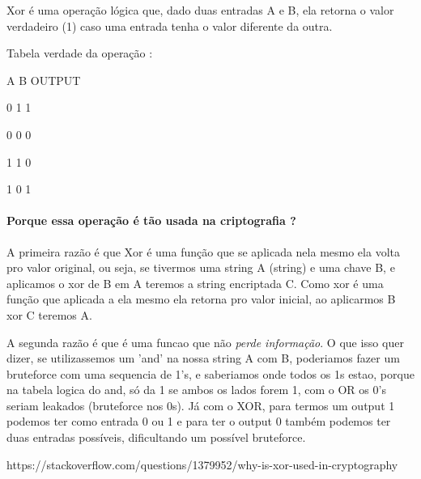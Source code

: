 \documentclass[11pt]{article}
\begin{document}
Xor é uma operação lógica que, dado duas entradas A e B, ela retorna o
valor verdadeiro (1) caso uma entrada tenha o valor diferente da outra.

Tabela verdade da operação :

A \textbar{} B \textbar{} OUTPUT

0 \textbar{} 1 \textbar{} 1

0 \textbar{} 0 \textbar{} 0

1 \textbar{} 1 \textbar{} 0

1 \textbar{} 0 \textbar{} 1

\paragraph{Porque essa operação é tão usada na criptografia
?}\label{porque-essa-operauxe7uxe3o-uxe9-tuxe3o-usada-na-criptografia}

A primeira razão é que Xor é uma função que se aplicada nela mesmo ela
volta pro valor original, ou seja, se tivermos uma string A (string) e
uma chave B, e aplicamos o xor de B em A teremos a string encriptada C.
Como xor é uma função que aplicada a ela mesmo ela retorna pro valor
inicial, ao aplicarmos B xor C teremos A.

A segunda razão é que é uma funcao que não \emph{perde informação}. O
que isso quer dizer, se utilizassemos um 'and' na nossa string A com B,
poderiamos fazer um bruteforce com uma sequencia de 1's, e saberiamos
onde todos os 1s estao, porque na tabela logica do and, só da 1 se ambos
os lados forem 1, com o OR os 0's seriam leakados (bruteforce nos 0s).
Já com o XOR, para termos um output 1 podemos ter como entrada 0 ou 1 e
para ter o output 0 também podemos ter duas entradas possíveis,
dificultando um possível bruteforce.

https://stackoverflow.com/questions/1379952/why-is-xor-used-in-cryptography
\end{document}
